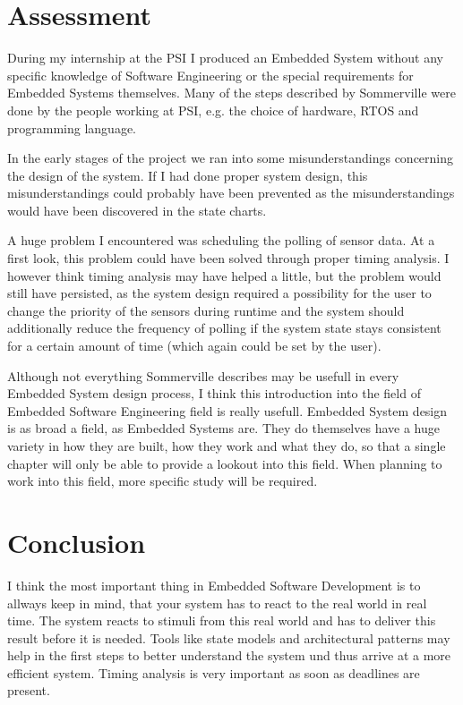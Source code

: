 \documentclass[10pt,a4paper,titlepage,draft]{article} %
\begin{document}
\section{Assessment}
During my internship at the PSI I produced an Embedded System without any specific knowledge of Software Engineering or the special requirements for Embedded Systems themselves.
Many of the steps described by Sommerville were done by the people working at PSI, e.g. the choice of hardware, RTOS and programming language.

In the early stages of the project we ran into some misunderstandings concerning the design of the system. If I had done proper system design, this misunderstandings could probably have been prevented as the misunderstandings would have been discovered in the state charts.

A huge problem I encountered was scheduling the polling of sensor data.
At a first look, this problem could have been solved through proper timing analysis.
I however think timing analysis may have helped a little, but the problem would still have persisted, as the system design required a possibility for the user to change the priority of the sensors during runtime and the system should additionally reduce the frequency of polling if the system state stays consistent for a certain amount of time (which again could be set by the user).

Although not everything Sommerville describes may be usefull in every Embedded System design process, I think this introduction into the field of Embedded Software Engineering field is really usefull.
Embedded System design is as broad a field, as Embedded Systems are.
They do themselves have a huge variety in how they are built, how they work and what they do, so that a single chapter will only be able to provide a lookout into this field.
When planning to work into this field, more specific study will be required.

\section{Conclusion}
I think the most important thing in Embedded Software Development is to allways keep in mind, that your system has to react to the real world in real time. The system reacts to stimuli from this real world and has to deliver this result before it is needed. Tools like state models and architectural patterns may help in the first steps to better understand the system und thus arrive at a more efficient system. Timing analysis is very important as soon as deadlines are present.
\end{document}
